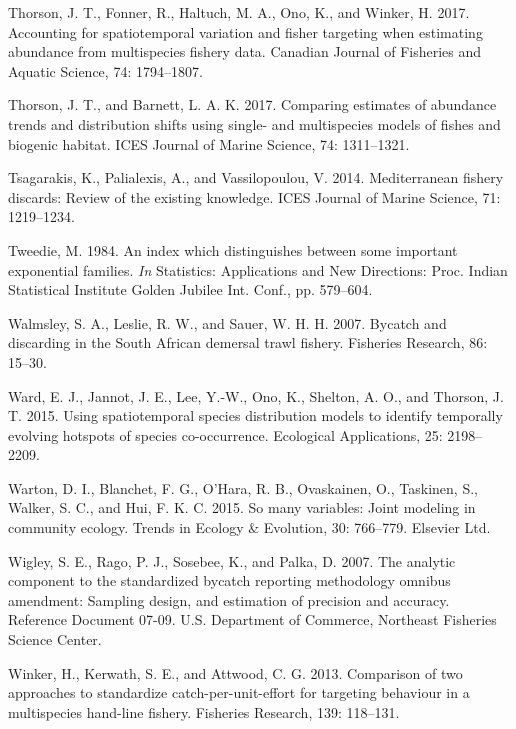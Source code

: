 \documentclass[]{article}
\begin{document}
\hypertarget{ref-thorson2017}{}
Thorson, J. T., Fonner, R., Haltuch, M. A., Ono, K., and Winker, H.
2017. Accounting for spatiotemporal variation and fisher targeting when
estimating abundance from multispecies fishery data. Canadian Journal of
Fisheries and Aquatic Science, 74: 1794--1807.

\hypertarget{ref-thorson2017vast}{}
Thorson, J. T., and Barnett, L. A. K. 2017. Comparing estimates of
abundance trends and distribution shifts using single- and multispecies
models of fishes and biogenic habitat. ICES Journal of Marine Science,
74: 1311--1321.

\hypertarget{ref-tsagarakis2014}{}
Tsagarakis, K., Palialexis, A., and Vassilopoulou, V. 2014.
Mediterranean fishery discards: Review of the existing knowledge. ICES
Journal of Marine Science, 71: 1219--1234.

\hypertarget{ref-tweedie1984}{}
Tweedie, M. 1984. An index which distinguishes between some important
exponential families. \emph{In} Statistics: Applications and New
Directions: Proc. Indian Statistical Institute Golden Jubilee Int.
Conf., pp. 579--604.

\hypertarget{ref-walmsley2007}{}
Walmsley, S. A., Leslie, R. W., and Sauer, W. H. H. 2007. Bycatch and
discarding in the South African demersal trawl fishery. Fisheries
Research, 86: 15--30.

\hypertarget{ref-ward2015}{}
Ward, E. J., Jannot, J. E., Lee, Y.-W., Ono, K., Shelton, A. O., and
Thorson, J. T. 2015. Using spatiotemporal species distribution models to
identify temporally evolving hotspots of species co-occurrence.
Ecological Applications, 25: 2198--2209.

\hypertarget{ref-warton2015}{}
Warton, D. I., Blanchet, F. G., O'Hara, R. B., Ovaskainen, O., Taskinen,
S., Walker, S. C., and Hui, F. K. C. 2015. So many variables: Joint
modeling in community ecology. Trends in Ecology \& Evolution, 30:
766--779. Elsevier Ltd.

\hypertarget{ref-wigley2007}{}
Wigley, S. E., Rago, P. J., Sosebee, K., and Palka, D. 2007. The
analytic component to the standardized bycatch reporting methodology
omnibus amendment: Sampling design, and estimation of precision and
accuracy. Reference Document 07-09. U.S. Department of Commerce,
Northeast Fisheries Science Center.

\hypertarget{ref-winker2013a}{}
Winker, H., Kerwath, S. E., and Attwood, C. G. 2013. Comparison of two
approaches to standardize catch-per-unit-effort for targeting behaviour
in a multispecies hand-line fishery. Fisheries Research, 139: 118--131.
\end{document}
